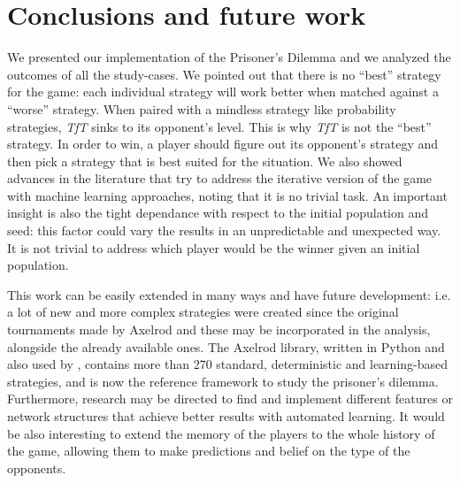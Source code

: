\documentclass[journal,10pt,twoside]{IEEEtran}
\begin{document}
\section{Conclusions and future work} \label{s:conc}
We presented our implementation of the Prisoner's Dilemma and we analyzed the outcomes of all the study-cases.
We pointed out that there is no ``best'' strategy for the game: each individual strategy will work better when matched against a ``worse'' strategy. When paired with a mindless strategy like probability strategies, \textit{TfT} sinks to its opponent's level. This is why \textit{TfT} is not the ``best'' strategy. In order to win, a player should figure out its opponent's strategy and then pick a strategy that is best suited for the situation.
We also showed advances in the literature that try to address the iterative version of the game with machine learning approaches, noting that it is no trivial task. 
An important insight is also the tight dependance with respect to the initial population and seed: this factor could vary the results in an unpredictable and unexpected way. It is not trivial to address which player would be the winner given an initial population.

This work can be easily extended in many ways and have future development: i.e. a lot of new and more complex strategies were created since the original tournaments made by Axelrod and these may be incorporated in the analysis, alongside the already available ones.
The Axelrod library, \cite{Knight2016Axel,axel-lib} written in Python and also used by \cite{plosRLdominant}, contains more than 270 standard, deterministic and learning-based strategies, and is now the reference framework to study the prisoner's dilemma.
Furthermore, research may be directed to find and implement different features or network structures that achieve better results with automated learning. It would be also interesting to extend the memory of the players to the whole history of the game, allowing them to make predictions and belief on the type of the opponents.

\balance



\onecolumn
{} \label{s:appendix}

\end{document}

